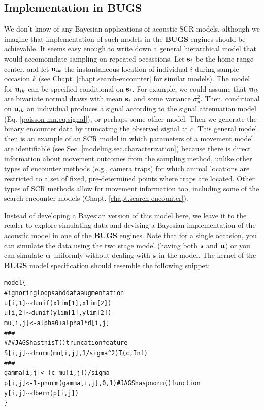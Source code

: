 \subsection{Implementation in {\bf BUGS}}
\label{acoustic.bugs}

We don't know of any Bayesian applications of acoustic SCR models,
although we imagine that implementation of such models in the {\bf
  BUGS} engines should be achievable.  It seems easy enough to write
down a general hierarchical model that would accomomdate sampling on
repeated occassions. Let ${\bf s}_{i}$ be the home range center, and
let ${\bf u}_{ik}$ the instantaneous location of individual $i$ during
sample occasion $k$ (see Chapt. \ref{chapt.search-encounter} for
similar models). The model for ${\bf u}_{ik}$ can be specified
conditional on ${\bf s}_{i}$. For example, we could assume that ${\bf
  u}_{ik}$ are bivariate normal draws with mean ${\bf s}_{i}$ and some
variance $\sigma_{u}^{2}$. Then, conditional on ${\bf u}_{ik}$ an
individual produces a signal according to the signal attenuation model
(Eq. \ref{poisson-mn.eq.signal}), or perhaps some other model. Then we
generate the binary encounter data by truncating the observed signal
at $c$. This general model then is an example of an SCR model in which
parameters of a movement model are identifiable
(see Sec. \ref{modeling.sec.characterization})
 because
there is direct information about movement outcomes from the sampling
method, unlike other types of encounter methods (e.g., camera traps)
for which animal locations are restricted to a set of fixed, pre-determined
points where traps are located.  Other types of SCR methods allow for
movement information too, including some of the search-encounter
models (Chapt. \ref{chapt.search-encounter}).


Instead of developing a Bayesian version of this model here,
we leave it to the reader to
explore simulating data and devising a Bayesian implementation of the
acoustic model in one of the {\bf BUGS} engines.
Note that for a
single occasion, you can simulate the data using the two stage model
(having both ${\bf s}$ and ${\bf u}$) or you can simulate ${\bf u}$
uniformly without dealing with ${\bf s}$ in the model.
The kernel of the {\bf BUGS} model specification 
should resemble the following snippet:
{\small
\begin{alltt}
model \{
  # ignoring loops and data augmentation
  u[i,1] \(\sim\) dunif(xlim[1], xlim[2])
  u[i,2] \(\sim\) dunif(ylim[1], ylim[2])
  mu[i,j] <- alpha0 + alpha1*d[i,j]
  ###
  ###  JAGS has this T() truncation feature
  S[i,j] \(\sim\) dnorm(mu[i,j], 1/sigma^2)T(c,Inf) 
  ###
  gamma[i,j] <- (c - mu[i,j])/sigma
  p[i,j] <- 1 - pnorm(gamma[i,j], 0, 1) # JAGS has pnorm() function
  y[i,j] \(\sim\) dbern(p[i,j])
\}
\end{alltt}
}



